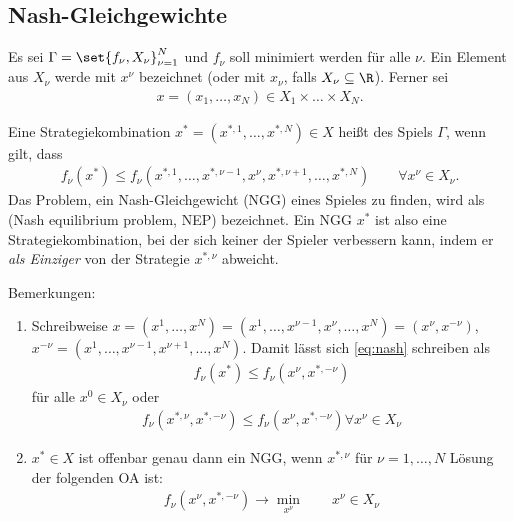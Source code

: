 \subsection{Nash-Gleichgewichte}
Es sei $\Gamma = \set{f_{\nu}, X_{\nu}}_{\nu = 1}^{N}$ und $f_{\nu}$ soll minimiert werden für alle $\nu$. Ein Element aus $X_{\nu}$ werde mit $x^{\nu}$ bezeichnet (oder mit $x_{\nu}$, falls $X_{\nu} \subseteq \R$). Ferner sei
\begin{align*}
  x = (x_{1}, \dots, x_{N}) \in X_{1} \times \dots \times X_{N}.
\end{align*}
\begin{definition*}
  Eine Strategiekombination $x^{*} = (x^{*, 1}, \dots, x^{*, N}) \in X$ heißt  des Spiels $\Gamma$, wenn gilt, dass
  \begin{align}\label{eq:nash}
    f_{\nu}(x^{*}) \leq f_{\nu}(x^{*, 1}, \dots, x^{*, \nu-1}, x^{\nu}, x^{*, \nu+1}, \dots, x^{*, N}) \qquad \forall x^{\nu} \in X_{\nu}.
  \end{align}
Das Problem, ein Nash-Gleichgewicht (NGG) eines Spieles zu finden, wird als  (Nash equilibrium problem, NEP) bezeichnet. Ein NGG $x^{*}$ ist also eine Strategiekombination, bei der sich keiner der Spieler verbessern kann, indem er \emph{als Einziger} von der Strategie $x^{*, \nu}$ abweicht. 
\end{definition*}
Bemerkungen:
\begin{enumerate}
\item Schreibweise $x = (x^{1}, \dots, x^{N}) = (x^{1}, \dots, x^{\nu-1}, x^{\nu}, \dots, x^{N})= (x^\nu, x^{-\nu})$, $x^{-\nu} =(x^{1}, \dots, x^{\nu-1}, x^{\nu+1}, \dots, x^{N}) $. Damit lässt sich \eqref{eq:nash} schreiben als
  \begin{align*}
    f_{\nu}(x^{*})\leq f_{\nu}(x^{\nu}, x^{*, -\nu}) 
  \end{align*}
für alle $x^{0} \in X_{\nu}$ oder 
\begin{align*}
      f_{\nu}(x^{*, \nu}, x^{*, -\nu})\leq f_{\nu}(x^{\nu}, x^{*, -\nu}) \forall x^{\nu} \in X_{\nu} 
\end{align*}
\item $x^{*} \in X$ ist offenbar genau dann ein NGG, wenn $x^{*, \nu}$ für $\nu = 1, \dots, N$ Lösung der folgenden OA ist:
  \begin{align}\label{eq:ngg_equ}
    f_{\nu}(x^{\nu}, x^{*, -\nu}) \to \min_{x^{\nu}} \qquad x^{\nu} \in X_{\nu}
  \end{align}

\end{enumerate}
